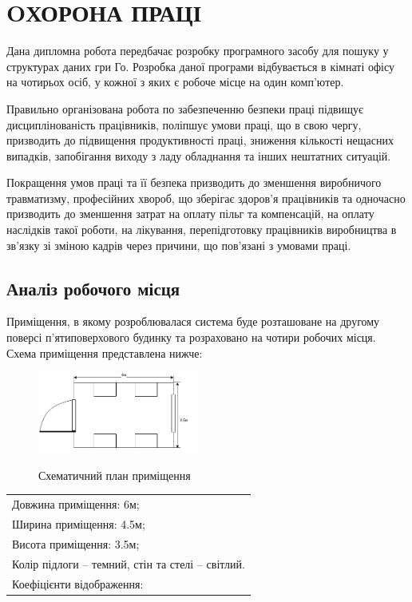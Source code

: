 \newpage
\section{OХОРОНА ПРАЦІ}
Дана дипломна робота передбачає розробку програмного засобу для пошуку у структурах даних гри Го.  Розробка даної програми відбувається в кімнаті офісу на чотирьох осіб, у кожної з яких є робоче місце на один комп’ютер.

Правильно організована робота по забезпеченню безпеки праці підвищує дисциплінованість працівників, поліпшує умови праці, що в свою чергу, призводить до підвищення продуктивності праці, зниження кількості нещасних випадків, запобігання  виходу з ладу обладнання та інших нештатних ситуацій.

Покращення умов праці та її безпека призводить до зменшення виробничого травматизму, професійних хвороб, що зберігає здоров’я працівників та одночасно призводить до зменшення затрат на оплату пільг та компенсацій, на оплату наслідків такої роботи, на лікування, перепідготовку працівників виробництва в зв’язку зі зміною кадрів через причини, що пов’язані з умовами праці.
\subsection{Аналіз робочого місця}
Приміщення, в якому розроблювалася система буде розташоване на другому поверсі п'ятиповерхового будинку та розраховано на чотири робочих місця. Схема приміщення представлена нижче:

\begin{figure}[H]
	\centering
	\caption{Схематичний план приміщення}
	\includegraphics[width=150pt]{safety_room_plan}
	\label{fig:safety_room_plan}
\end{figure}

\begin{tabular}{l}
	Довжина приміщення: 6м;\\
	Ширина приміщення: 4.5м;\\
	Висота приміщення: 3.5м;\\
	Колір підлоги – темний, стін та стелі – світлий.\\
	Коефіцієнти відображення:
\end{tabular}

